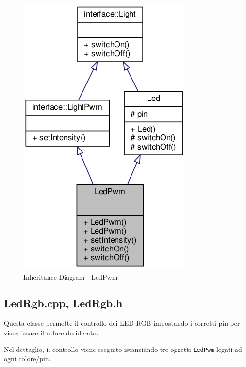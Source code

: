 \begin{figure}[!ht]
	\centering
	\includegraphics[scale=.4]{img/UML/InheritanceDiagram/LedPwm.png}
	\caption{Inheritance Diagram - LedPwm}
\end{figure}

\newpage
\subsection{LedRgb.cpp, LedRgb.h}
Questa classe permette il controllo dei LED RGB impostando i corretti pin per visualizzare il colore desiderato.

Nel dettaglio, il controllo viene eseguito istanziando tre oggetti \texttt{LedPwm} legati ad ogni colore/pin.
